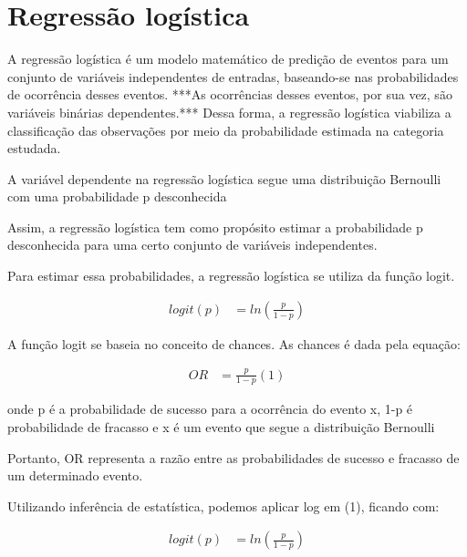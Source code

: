 \section{Regressão logística}
A regressão logística é um modelo matemático de predição de eventos para um conjunto de variáveis independentes de entradas, baseando-se nas probabilidades de ocorrência desses eventos. ***As ocorrências desses eventos, por sua vez, são  variáveis binárias dependentes.*** Dessa forma, a regressão logística viabiliza a classificação das observações por meio da probabilidade estimada na categoria estudada.

A variável dependente na regressão logística segue uma distribuição Bernoulli com uma probabilidade p desconhecida

Assim, a regressão logística tem como propósito estimar a probabilidade p desconhecida para uma certo conjunto de variáveis independentes.

Para estimar essa probabilidades, a regressão logística se utiliza da função logit.

\begin{equation}
  \label{eq:t}
  \begin{aligned}
    logit(p) &= ln\left ( \frac{p}{1-p} \right )
  \end{aligned}  
\end{equation}

A função logit se baseia no conceito de chances. As chances é dada pela equação:

\begin{equation}
  \label{eq:t}
  \begin{aligned}
    OR &= \frac{p}{1-p} (1)
  \end{aligned}
\end{equation}

onde p é a probabilidade de sucesso para a ocorrência do evento x, 1-p é probabilidade de fracasso e x é um evento que segue a distribuição Bernoulli

Portanto, OR representa a razão entre as probabilidades de sucesso e fracasso de um determinado evento. 

Utilizando inferência de estatística, podemos aplicar log em (1), ficando com:

\begin{equation}
  \label{eq:t}
  \begin{aligned}
    logit(p) &= ln\left ( \frac{p}{1-p} \right )
  \end{aligned}
\end{equation}


